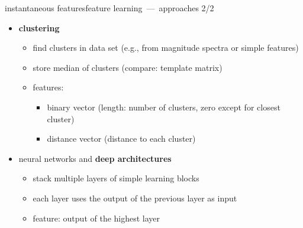         \begin{frame}{instantaneous features}{feature learning~---~approaches 2/2}
            \begin{itemize}
                \item   \textbf{clustering} 
                    \begin{itemize}
                        \item   find clusters in data set (e.g., from magnitude spectra or simple features)
                        \item   store median of clusters (compare: template matrix)
                        \smallskip
                        \item<2->[$\rightarrow$]   features:
                            \begin{itemize}
                                \item   binary vector (length: number of clusters, zero except for closest cluster)
                                \item   distance vector (distance to each cluster)
                            \end{itemize}
                    \end{itemize}
                \bigskip
                \item<3->   neural networks and \textbf{deep architectures} 
                    \begin{itemize}
                        \item   stack multiple layers of simple learning blocks
                        \item   each layer uses the output of the previous layer as input
                        \smallskip
                        \item<4->[$\rightarrow$]   feature: output of the highest layer
                    \end{itemize}
            \end{itemize}
		\end{frame}

